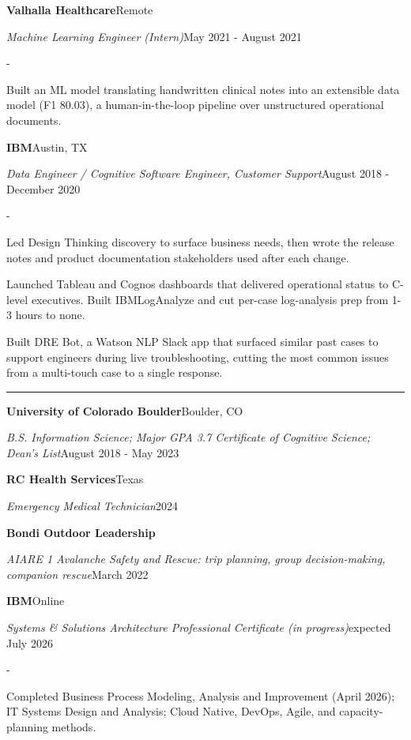 \documentclass[10pt,letterpaper]{article}
\newenvironment{cvitems}{%
  \begin{list}{-}{%
    \setlength{\leftmargin}{12pt}%
    \setlength{\itemsep}{2.0pt}%
    \setlength{\parsep}{0pt}%
    \setlength{\topsep}{1.5pt}%
    \setlength{\partopsep}{0pt}%
    \setlength{\labelwidth}{6pt}%
    \setlength{\labelsep}{6pt}%
    \setlength{\itemindent}{0pt}%
  }%
}{\end{list}}
\newcommand{\cvsection}[1]{%
  \vspace{7pt}%
  \noindent{\bfseries\fontsize{11pt}{13pt}\selectfont\MakeUppercase{#1}}\par
  \vspace{1pt}%
  \noindent\rule{\textwidth}{0.4pt}\par
  \vspace{4pt}%
}
\newcommand{\cventryhead}[4]{%
  \noindent\textbf{#1}\hfill#2\par
  \vspace{0.5pt}%
  \noindent\textit{#3}\hfill#4\par
}
\newcommand{\cveduhead}[4]{%
  \noindent\textbf{#1}\hfill#2\par
  \vspace{0.5pt}%
  \noindent\textit{#3}\hfill#4\par
}
\begin{document}
\vspace{3pt}
\cventryhead{Valhalla Healthcare}{Remote}
{Machine Learning Engineer (Intern)}{May 2021 - August 2021}
\begin{cvitems}
  \item Built an ML model translating handwritten clinical notes into an extensible data model (F1 80.03), a human-in-the-loop pipeline over unstructured operational documents.
\end{cvitems}

\vspace{3pt}
\cventryhead{IBM}{Austin, TX}
{Data Engineer / Cognitive Software Engineer, Customer Support}{August 2018 - December 2020}
\begin{cvitems}
  \item Led Design Thinking discovery to surface business needs, then wrote the release notes and product documentation stakeholders used after each change.
  \item Launched Tableau and Cognos dashboards that delivered operational status to C-level executives. Built IBMLogAnalyze and cut per-case log-analysis prep from 1-3 hours to none.
  \item Built DRE Bot, a Watson NLP Slack app that surfaced similar past cases to support engineers during live troubleshooting, cutting the most common issues from a multi-touch case to a single response.
\end{cvitems}

\cvsection{Education}

\cveduhead{University of Colorado Boulder}{Boulder, CO}
{B.S. Information Science; Major GPA 3.7 \textbar{} Certificate of Cognitive Science; Dean's List}{August 2018 - May 2023}

\vspace{3pt}
\cveduhead{RC Health Services}{Texas}
{Emergency Medical Technician}{2024}

\vspace{3pt}
\cveduhead{Bondi Outdoor Leadership}{}
{AIARE 1 Avalanche Safety and Rescue: trip planning, group decision-making, companion rescue}{March 2022}

\vspace{3pt}
\cveduhead{IBM}{Online}
{Systems \& Solutions Architecture Professional Certificate (in progress)}{expected July 2026}
\begin{cvitems}
  \item Completed Business Process Modeling, Analysis and Improvement (April 2026); IT Systems Design and Analysis; Cloud Native, DevOps, Agile, and capacity-planning methods.
\end{cvitems}
\end{document}
